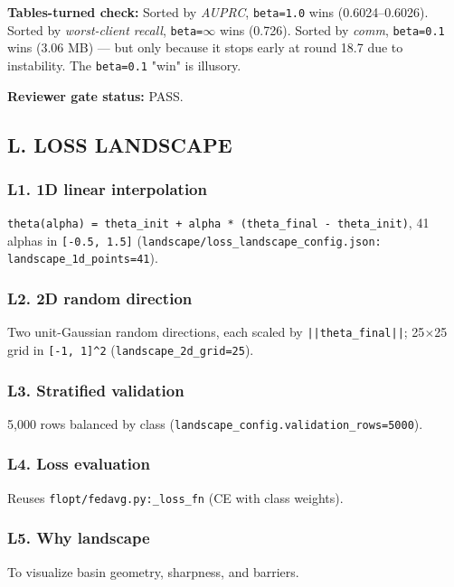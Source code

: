 \documentclass{article}
\begin{document}
\textbf{Tables-turned check:} Sorted by \emph{AUPRC}, \texttt{beta=1.0} wins (0.6024--0.6026). Sorted by \emph{worst-client recall}, \texttt{beta=\ensuremath{\infty}} wins (0.726). Sorted by \emph{comm}, \texttt{beta=0.1} wins (3.06 MB) --- but only because it stops early at round 18.7 due to instability. The \texttt{beta=0.1} "win" is illusory.


\textbf{Reviewer gate status:} PASS.


\subsection{L. LOSS LANDSCAPE}


\subsubsection{L1. 1D linear interpolation}


\texttt{theta(alpha) = theta\_init + alpha * (theta\_final - theta\_init)}, 41 alphas in \texttt{[-0.5, 1.5]} (\texttt{landscape/loss\_landscape\_config.json: landscape\_1d\_points=41}).


\subsubsection{L2. 2D random direction}


Two unit-Gaussian random directions, each scaled by \texttt{||theta\_final||}; 25\ensuremath{\times}25 grid in \texttt{[-1, 1]\textasciicircum{}2} (\texttt{landscape\_2d\_grid=25}).


\subsubsection{L3. Stratified validation}


5,000 rows balanced by class (\texttt{landscape\_config.validation\_rows=5000}).


\subsubsection{L4. Loss evaluation}


Reuses \texttt{flopt/fedavg.py:\_loss\_fn} (CE with class weights).


\subsubsection{L5. Why landscape}


To visualize basin geometry, sharpness, and barriers.
\end{document}
